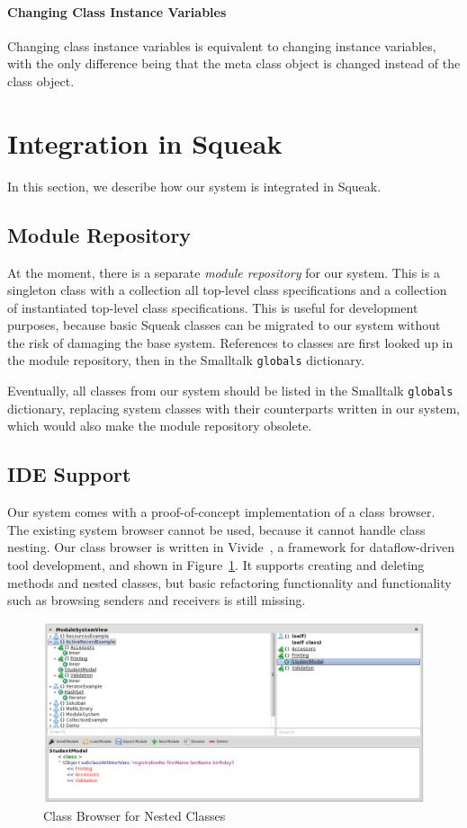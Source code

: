 \paragraph{Changing Class Instance Variables}
Changing class instance variables is equivalent to changing instance variables, with the only difference being that the meta class object is changed instead of the class object.

\section{Integration in Squeak}
In this section, we describe how our system is integrated in Squeak.

\subsection{Module Repository}
At the moment, there is a separate \emph{module repository} for our system. This is a singleton class with a collection all top-level class specifications and a collection of instantiated top-level class specifications. This is useful for development purposes, because basic Squeak classes can be migrated to our system without the risk of damaging the base system. References to classes are first looked up in the module repository, then in the Smalltalk \texttt{globals} dictionary.

Eventually, all classes from our system should be listed in the Smalltalk \texttt{globals} dictionary, replacing system classes with their counterparts written in our system, which would also make the module repository obsolete.

\subsection{IDE Support}
Our system comes with a proof-of-concept implementation of a class browser. The existing system browser cannot be used, because it cannot handle class nesting. Our class browser is written in Vivide~\cite{Taeumel:2012:VPE:2384592.2384604}, a framework for dataflow-driven tool development, and shown in Figure~\ref{fig:impl_class_browser}. It supports creating and deleting methods and nested classes, but basic refactoring functionality and functionality such as browsing senders and receivers is still missing.

\begin{figure}[!htp]
	\centering
	\includegraphics[width=\textwidth]{screenshot_classbrowser.png}
	\caption{Class Browser for Nested Classes}
	\label{fig:impl_class_browser}
\end{figure}

